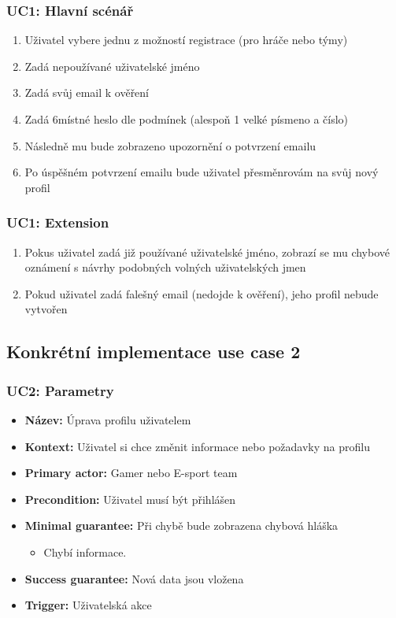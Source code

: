 \documentclass[czech,12pt,a4paper,titlepage]{article}
\begin{document}
\subsubsection{UC1: Hlavní scénář}

\begin{enumerate}
    \item Uživatel vybere jednu z možností registrace (pro hráče nebo týmy)
    \item Zadá nepoužívané uživatelské jméno
    \item Zadá svůj email k ověření
    \item Zadá 6místné heslo dle podmínek (alespoň 1 velké písmeno a číslo)
    \item Následně mu bude zobrazeno upozornění o potvrzení emailu
    \item Po úspěšném potvrzení emailu bude uživatel přesměnrovám na svůj nový profil
\end{enumerate}

\subsubsection{UC1: Extension}

\begin{enumerate}
    \item Pokus uživatel zadá již používané uživatelské jméno, zobrazí
          se mu chybové oznámení s návrhy podobných volných uživatelských jmen
    \item Pokud uživatel zadá falešný email (nedojde k ověření), jeho profil nebude vytvořen
\end{enumerate}

\clearpage

\subsection{Konkrétní implementace use case 2}

\subsubsection{UC2: Parametry}

\begin{itemize}
    \item \textbf{Název:} Úprava profilu uživatelem
    \item \textbf{Kontext:} Uživatel si chce změnit informace nebo požadavky na profilu
    \item \textbf{Primary actor:} Gamer nebo E-sport team
    \item \textbf{Precondition:} Uživatel musí být přihlášen
    \item \textbf{Minimal guarantee:} Při chybě bude zobrazena chybová hláška
          \begin{itemize}
              \item Chybí informace.
          \end{itemize}
    \item \textbf{Success guarantee:} Nová data jsou vložena
    \item \textbf{Trigger:} Uživatelská akce
\end{itemize}
\end{document}
